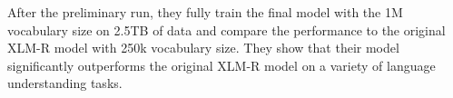 After the preliminary run, they fully train the final model with the 1M vocabulary size on 2.5TB of data and compare the performance to the original XLM-R model with 250k vocabulary size. They show that their model significantly outperforms the original XLM-R model on a variety of language understanding tasks.






